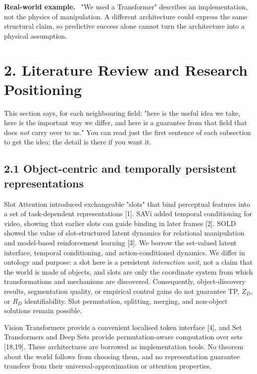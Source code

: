 \documentclass[11pt]{article}
\newenvironment{plainword}{%
  \par\medskip\noindent\begin{minipage}{\textwidth}%
  \color{gray!75!black}\small\itshape
}{%
  \end{minipage}\par\medskip}
\newenvironment{example}{%
  \par\smallskip\noindent\begin{minipage}{\textwidth}%
  \color{teal!60!black}\small
  \textbf{\color{teal!70!black}Real-world example.}\
}{%
  \end{minipage}\par\smallskip}
\begin{document}
\begin{example}
"We used a Transformer" describes an implementation, not the physics of manipulation. A different architecture could express the
same structural claim, so predictive success alone cannot turn the architecture into a physical assumption.
\end{example}

\section*{2. Literature Review and Research Positioning}

\begin{plainword}
This section says, for each neighbouring field: "here is the useful idea we take, here is the important way we differ, and here
is a guarantee from that field that does \emph{not} carry over to us." You can read just the first sentence of each subsection to
get the idea; the detail is there if you want it.
\end{plainword}

\subsection*{2.1 Object-centric and temporally persistent representations}

Slot Attention introduced exchangeable "slots" that bind perceptual features into a set of task-dependent representations [1].
SAVi added temporal conditioning for video, showing that earlier slots can guide binding in later frames [2]. SOLD showed the value
of slot-structured latent dynamics for relational manipulation and model-based reinforcement learning [3]. We borrow the
set-valued latent interface, temporal conditioning, and action-conditioned dynamics. We differ in ontology and purpose: a slot
here is a persistent \emph{interaction unit}, not a claim that the world is made of objects, and slots are only the coordinate
system from which transformations and mechanisms are discovered. Consequently, object-discovery results, segmentation quality, or
empirical control gains do not guarantee TP, $Z_D$, or $R_D$ identifiability. Slot permutation, splitting, merging, and non-object
solutions remain possible.

Vision Transformers provide a convenient localised token interface [4], and Set Transformers and Deep Sets provide
permutation-aware computation over sets [18,19]. These architectures are borrowed as implementation tools. No theorem about the
world follows from choosing them, and no representation guarantee transfers from their universal-approximation or attention
properties.
\end{document}
